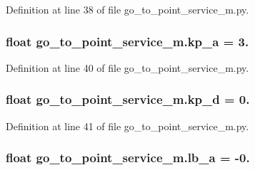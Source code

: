 Definition at line 38 of file go\+\_\+to\+\_\+point\+\_\+service\+\_\+m.\+py.

\subsubsection[{\texorpdfstring{kp\+\_\+a}{kp_a}}]{\setlength{\rightskip}{0pt plus 5cm}float go\+\_\+to\+\_\+point\+\_\+service\+\_\+m.\+kp\+\_\+a = 3.}\hypertarget{namespacego__to__point__service__m_a7e9c758884ac92bbb820e532fd32abf6}{}\label{namespacego__to__point__service__m_a7e9c758884ac92bbb820e532fd32abf6}


Definition at line 40 of file go\+\_\+to\+\_\+point\+\_\+service\+\_\+m.\+py.

\subsubsection[{\texorpdfstring{kp\+\_\+d}{kp_d}}]{\setlength{\rightskip}{0pt plus 5cm}float go\+\_\+to\+\_\+point\+\_\+service\+\_\+m.\+kp\+\_\+d = 0.}\hypertarget{namespacego__to__point__service__m_aa9ffa11cdce18c2942bca64db42cb249}{}\label{namespacego__to__point__service__m_aa9ffa11cdce18c2942bca64db42cb249}


Definition at line 41 of file go\+\_\+to\+\_\+point\+\_\+service\+\_\+m.\+py.

\subsubsection[{\texorpdfstring{lb\+\_\+a}{lb_a}}]{\setlength{\rightskip}{0pt plus 5cm}float go\+\_\+to\+\_\+point\+\_\+service\+\_\+m.\+lb\+\_\+a = -\/0.}\hypertarget{namespacego__to__point__service__m_a66ab9d35823a86f4fee11da3fa6a7157}{}\label{namespacego__to__point__service__m_a66ab9d35823a86f4fee11da3fa6a7157}


